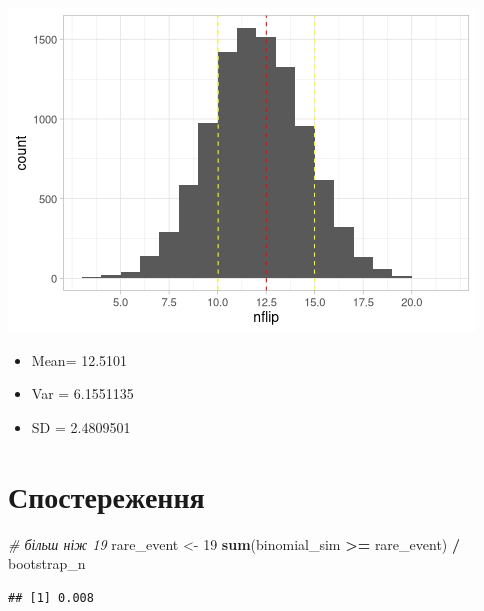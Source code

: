 \documentclass[
  10pt,
]{article}
\newenvironment{Shaded}{\begin{snugshade}}{\end{snugshade}}
\newcommand{\CommentTok}[1]{\textcolor[rgb]{0.56,0.35,0.01}{\textit{#1}}}
\newcommand{\DecValTok}[1]{\textcolor[rgb]{0.00,0.00,0.81}{#1}}
\newcommand{\FunctionTok}[1]{\textcolor[rgb]{0.13,0.29,0.53}{\textbf{#1}}}
\newcommand{\NormalTok}[1]{#1}
\newcommand{\OtherTok}[1]{\textcolor[rgb]{0.56,0.35,0.01}{#1}}
\newcommand{\SpecialCharTok}[1]{\textcolor[rgb]{0.81,0.36,0.00}{\textbf{#1}}}
\providecommand{\tightlist}{%
  \setlength{\itemsep}{0pt}\setlength{\parskip}{0pt}}
\begin{document}
\includegraphics{05.pvalues_files/figure-latex/unnamed-chunk-2-1.png}

\begin{itemize}
\tightlist
\item
  Mean= 12.5101
\item
  Var = 6.1551135
\item
  SD = 2.4809501
\end{itemize}

\newpage

\hypertarget{ux441ux43fux43eux441ux442ux435ux440ux435ux436ux435ux43dux43dux44f}{%
\section{Спостереження}\label{ux441ux43fux43eux441ux442ux435ux440ux435ux436ux435ux43dux43dux44f}}

\begin{Shaded}
\begin{Highlighting}[]
\CommentTok{\# більш ніж 19}
\NormalTok{rare\_event }\OtherTok{\textless{}{-}} \DecValTok{19}
\FunctionTok{sum}\NormalTok{(binomial\_sim }\SpecialCharTok{\textgreater{}=}\NormalTok{ rare\_event) }\SpecialCharTok{/}\NormalTok{ bootstrap\_n}
\end{Highlighting}
\end{Shaded}

\begin{verbatim}
## [1] 0.008
\end{verbatim}

\begin{Shaded}
\end{Shaded}
\end{document}
